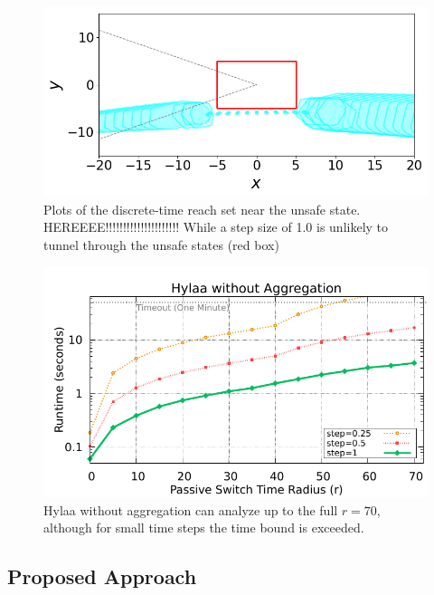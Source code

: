 \begin{figure}
\begin{minipage}[b]{\linewidth}
\end{minipage}
\\
\vspace{1em}
\begin{minipage}[b]{\linewidth}
  \centering
    \includegraphics[width=0.9\columnwidth,trim=0 1.3em 0 0, clip]{images/deagg_1_0.png}
\end{minipage}
\caption{Plots of the discrete-time reach set near the unsafe state.
HEREEEE!!!!!!!!!!!!!!!!!!!!!
  While a step size of 1.0 is unlikely to tunnel through the unsafe states (red box)}\label{fig:1}
\end{figure}


\begin{figure}[t]
\centerline{\includegraphics[width=0.9\columnwidth]{images/hylaa_unagg.pdf}}
\caption{Hylaa without aggregation can analyze up to the full $r=70$, although for small time steps the time bound is exceeded.}
\label{fig:hylaa_unagg}
\end{figure}

\subsection{Proposed Approach}

